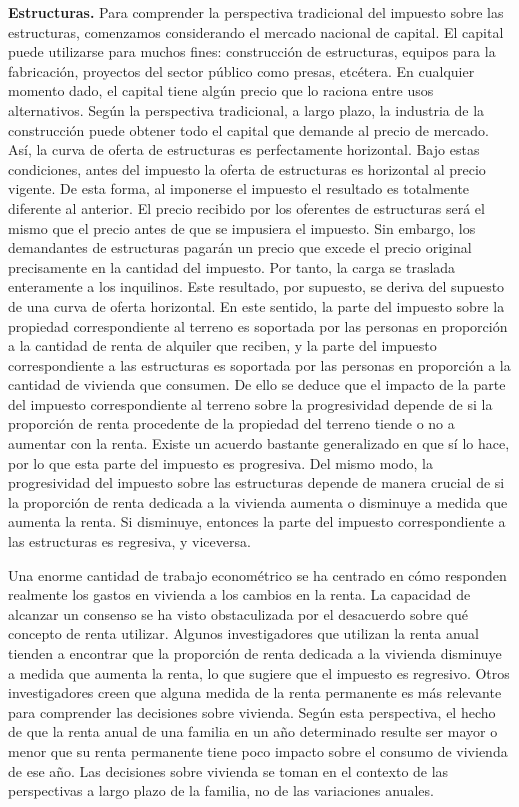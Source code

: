 \documentclass[10pt,a4paper]{article}
\begin{document}
{\textbf{Estructuras.} Para comprender la perspectiva tradicional del impuesto sobre las estructuras, comenzamos considerando el mercado nacional de capital. El capital puede utilizarse para muchos fines: construcción de estructuras, equipos para la fabricación, proyectos del sector público como presas, etcétera. En cualquier momento dado, el capital tiene algún precio que lo raciona entre usos alternativos. Según la perspectiva tradicional, a largo plazo, la industria de la construcción puede obtener todo el capital que demande al precio de mercado. Así, la curva de oferta de estructuras es perfectamente horizontal. Bajo estas condiciones, antes del impuesto la oferta de estructuras es horizontal al precio vigente. De esta forma, al imponerse el impuesto el resultado es totalmente diferente al anterior. El precio recibido por los oferentes de estructuras será el mismo que el precio antes de que se impusiera el impuesto. Sin embargo, los demandantes de estructuras pagarán un precio que excede el precio original precisamente en la cantidad del impuesto. Por tanto, la carga se traslada enteramente a los inquilinos. Este resultado, por supuesto, se deriva del supuesto de una curva de oferta horizontal.
} En este sentido, la parte del impuesto sobre la propiedad correspondiente al terreno es soportada por las personas en proporción a la cantidad de renta de alquiler que reciben, y la parte del impuesto correspondiente a las estructuras es soportada por las personas en proporción a la cantidad de vivienda que consumen. De ello se deduce que el impacto de la parte del impuesto correspondiente al terreno sobre la progresividad depende de si la proporción de renta procedente de la propiedad del terreno tiende o no a aumentar con la renta. Existe un acuerdo bastante generalizado en que sí lo hace, por lo que esta parte del impuesto es progresiva. Del mismo modo, la progresividad del impuesto sobre las estructuras depende de manera crucial de si la proporción de renta dedicada a la vivienda aumenta o disminuye a medida que aumenta la renta. Si disminuye, entonces la parte del impuesto correspondiente a las estructuras es regresiva, y viceversa.

Una enorme cantidad de trabajo econométrico se ha centrado en cómo responden realmente los gastos en vivienda a los cambios en la renta. La capacidad de alcanzar un consenso se ha visto obstaculizada por el desacuerdo sobre qué concepto de renta utilizar. Algunos investigadores que utilizan la renta anual tienden a encontrar que la proporción de renta dedicada a la vivienda disminuye a medida que aumenta la renta, lo que sugiere que el impuesto es regresivo. Otros investigadores creen que alguna medida de la renta permanente es más relevante para comprender las decisiones sobre vivienda. Según esta perspectiva, el hecho de que la renta anual de una familia en un año determinado resulte ser mayor o menor que su renta permanente tiene poco impacto sobre el consumo de vivienda de ese año. Las decisiones sobre vivienda se toman en el contexto de las perspectivas a largo plazo de la familia, no de las variaciones anuales.
\end{document}
